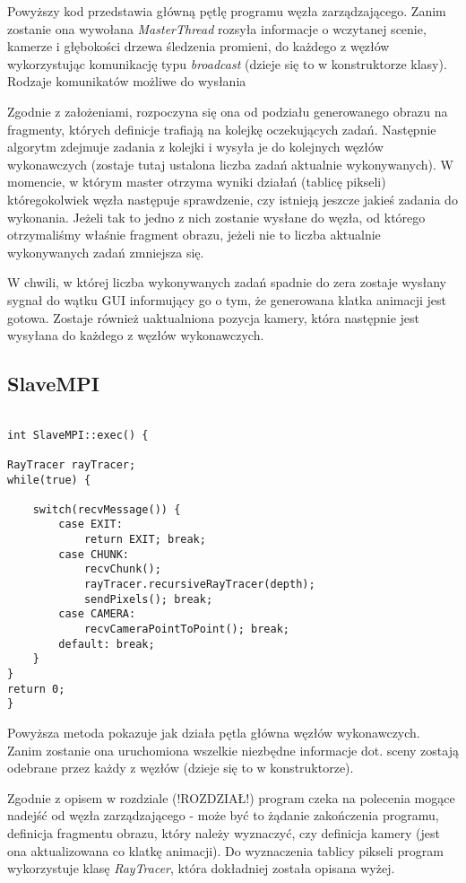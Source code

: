 Powyższy kod przedstawia główną pętlę programu węzła zarządzającego. Zanim zostanie ona wywołana \emph{MasterThread} rozsyła informacje o wczytanej scenie, kamerze i głębokości drzewa śledzenia promieni, do każdego z węzłów wykorzystując komunikację typu \emph{broadcast} (dzieje się to w konstruktorze klasy). Rodzaje komunikatów możliwe do wysłania  

Zgodnie z założeniami, rozpoczyna się ona od podziału generowanego obrazu na fragmenty, których definicje trafiają na kolejkę oczekujących zadań. Następnie algorytm zdejmuje zadania z kolejki i wysyła je do kolejnych węzłów wykonawczych (zostaje tutaj ustalona liczba zadań aktualnie wykonywanych). W momencie, w którym master otrzyma wyniki działań (tablicę pikseli) któregokolwiek węzła następuje sprawdzenie, czy istnieją jeszcze jakieś zadania do wykonania. Jeżeli tak to jedno z nich zostanie wysłane do węzła, od którego otrzymaliśmy właśnie fragment obrazu, jeżeli nie to liczba aktualnie wykonywanych zadań zmniejsza się.

W chwili, w której liczba wykonywanych zadań spadnie do zera zostaje wysłany sygnał do wątku GUI informujący go o tym, że generowana klatka animacji jest gotowa. Zostaje również uaktualniona pozycja kamery, która następnie jest wysyłana do każdego z węzłów wykonawczych.

\subsection{SlaveMPI}

\begin{lstlisting}

int SlaveMPI::exec() {

RayTracer rayTracer;
while(true) {

    switch(recvMessage()) {
        case EXIT:
            return EXIT; break;
        case CHUNK:
            recvChunk();
            rayTracer.recursiveRayTracer(depth);
            sendPixels(); break;
        case CAMERA:
            recvCameraPointToPoint(); break;
        default: break;
    }
}
return 0;
}

\end{lstlisting}


Powyższa metoda pokazuje jak działa pętla główna węzłów wykonawczych. Zanim zostanie ona uruchomiona wszelkie niezbędne informacje dot. sceny zostają odebrane przez każdy z węzłów (dzieje się to w konstruktorze). 

Zgodnie z opisem w rozdziale (!ROZDZIAŁ!) program czeka na polecenia mogące nadejść od węzła zarządzającego - może być to żądanie zakończenia programu, definicja fragmentu obrazu, który należy wyznaczyć, czy definicja kamery (jest ona aktualizowana co klatkę animacji). Do wyznaczenia tablicy pikseli program wykorzystuje klasę \emph{RayTracer}, która dokładniej została opisana wyżej. 

